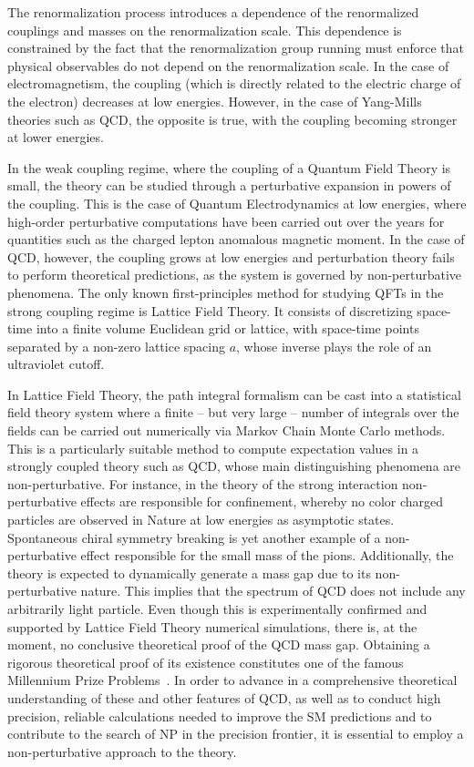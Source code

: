 The renormalization process introduces a dependence of the renormalized couplings and masses  on the renormalization scale. This dependence is  constrained by the fact that the renormalization group running  must enforce that physical observables do not depend on the renormalization scale.  In the case of electromagnetism, the coupling (which is directly related to the electric charge of the electron) decreases at low energies. However, in the case of Yang-Mills theories such as QCD, the opposite is true, with the coupling becoming stronger at lower energies. 

In the weak coupling regime, where the coupling of a Quantum Field Theory is small, the theory can be studied through a perturbative expansion in powers of the coupling. This is the case of Quantum Electrodynamics at low energies, where high-order perturbative computations have been carried out over the years for quantities such as the charged lepton anomalous magnetic moment. In the case of QCD, however, the coupling grows at low energies and perturbation theory fails to perform theoretical predictions, as the system is governed by non-perturbative phenomena. The only known first-principles method for studying QFTs in the strong coupling regime is Lattice Field Theory. It consists of discretizing space-time into a finite volume Euclidean grid or lattice, with space-time points separated by a non-zero lattice spacing $a$, whose inverse plays the role of an ultraviolet cutoff. 

In Lattice Field Theory, the path integral  formalism can be cast into a statistical field theory system where a finite -- but very large -- number of integrals over the fields can be carried out numerically via Markov Chain Monte Carlo methods. This is a particularly suitable method to compute expectation values in a strongly coupled theory such as QCD, whose main distinguishing phenomena are non-perturbative. For instance, in the theory of the strong interaction non-perturbative effects are responsible for confinement, whereby no color charged particles are observed in Nature at low energies as asymptotic states. Spontaneous chiral symmetry breaking is yet another example of a non-perturbative effect responsible for the small mass of the pions. Additionally, the theory is expected to dynamically generate a mass gap due to its non-perturbative nature. This implies that the spectrum of QCD does not include any arbitrarily light particle. Even though this is experimentally confirmed and supported by Lattice Field Theory numerical simulations, there is, at the moment, no conclusive theoretical proof of the QCD mass gap. Obtaining a rigorous theoretical proof of its existence constitutes one of the famous Millennium Prize Problems~\citep{MillenniumPrizeproblems}. In order to advance in a comprehensive theoretical understanding of these and other features of QCD, as well as to conduct high precision, reliable calculations needed to improve the SM predictions and to contribute to the search of NP in the precision frontier, it is essential to employ a non-perturbative approach to the theory.

